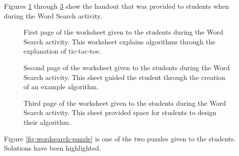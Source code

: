 	\label{sec:wordsearchhandout}
	Figures \ref{fig:StudentWorksheet1} through \ref{fig:StudentWorksheet3} show the handout that was provided to students when during the Word Search activity.
	

\begin{figure}%
   \centering
   \caption[Word Search handout, page 1.]{First page of the worksheet given to the students during the Word Search activity. This worksheet explains algorithms through the explanation of tic-tac-toe.}
   \label{fig:StudentWorksheet1}
\end{figure}
	
\begin{figure}%
   \centering
   \caption[Word Search handout, page 2.]{Second page of the worksheet given to the students during the Word Search activity. This sheet guided the student through the creation of an example algorithm.}
   \label{fig:StudentWorksheet2}
\end{figure}
	
\begin{figure}%
   \centering
   \caption[Word Search handout, page 3.]{Third page of the worksheet given to the students during the Word Search activity. This sheet provided space for students to design their algorithm.}
   \label{fig:StudentWorksheet3}
\end{figure}

	\label{sec:wordsearchpuzzle}
	Figure \ref{fig:wordsearch-puzzle} is one of the two puzzles given to the students. Solutions have been highlighted.
	
	
